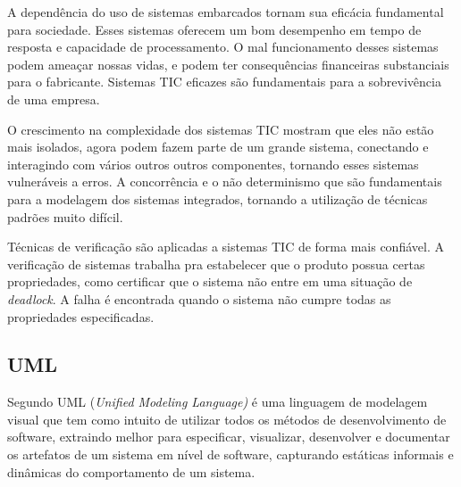 A dependência do uso de sistemas embarcados tornam sua eficácia fundamental para sociedade. Esses sistemas oferecem um bom desempenho em tempo de resposta e capacidade de processamento. O mal funcionamento desses sistemas podem ameaçar nossas vidas, e podem ter consequências financeiras substanciais para o fabricante. Sistemas TIC eficazes são fundamentais para a sobrevivência de uma empresa.


O crescimento na complexidade dos sistemas TIC mostram que eles não estão mais isolados, agora podem fazem parte de um grande sistema, conectando e interagindo com vários outros outros componentes, tornando esses sistemas vulneráveis a erros. 
A concorrência e o não determinismo que são fundamentais para a modelagem dos sistemas integrados, tornando a utilização de técnicas padrões muito difícil.

Técnicas de verificação são aplicadas a sistemas TIC de forma mais confiável. A verificação de sistemas trabalha pra estabelecer que o produto possua certas propriedades, como certificar que o sistema não entre em uma situação de \textit{deadlock}. A falha é encontrada quando o sistema não cumpre todas as propriedades especificadas.



\subsection{UML}

Segundo  UML (\textit{Unified Modeling Language)} é uma linguagem de modelagem visual que tem como intuito de utilizar todos os métodos de desenvolvimento de software, extraindo melhor para especificar, visualizar, desenvolver e documentar os artefatos de um sistema em nível de software, capturando estáticas informais e dinâmicas do comportamento de um sistema.



